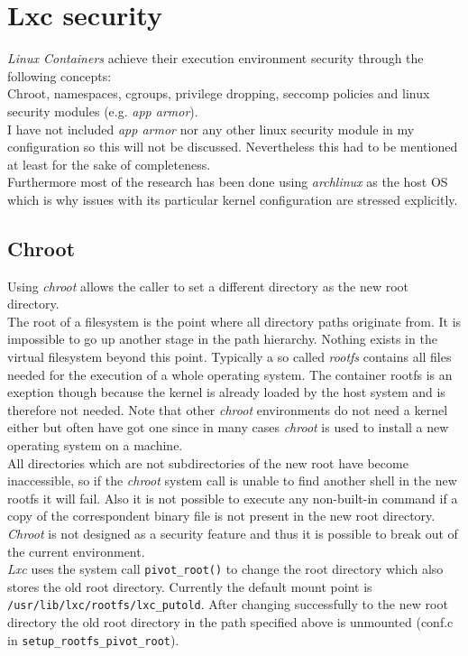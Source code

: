 \chapter{Lxc security}\label{features}

\textit{Linux Containers} achieve their execution environment security through the following concepts:\\
Chroot, namespaces, cgroups, privilege dropping, seccomp policies and linux security modules (e.g. \textit{app armor}).\\
I have not included \textit{app armor} nor any other linux security module in my configuration so this will not be discussed.
Nevertheless this had to be mentioned at least for the sake of completeness.\\
Furthermore most of the research has been done using \textit{archlinux} as the host OS which is why issues with its particular
kernel configuration are stressed explicitly.

\section{Chroot}\label{rootfs}

Using \textit{chroot} allows the caller to set a different directory as the new root directory.\\
The root of a filesystem is the point where all directory paths originate from. It is impossible to go up another stage in the path hierarchy.
Nothing exists in the virtual filesystem beyond this point. Typically a so called \textit{rootfs} contains all files needed for
the execution of a whole operating system.
The container rootfs is an exeption though because the kernel is already loaded by
the host system and is therefore not needed. Note that other \textit{chroot} environments do not need a kernel either but often have got one
since in many cases \textit{chroot} is used to install a new operating system on a machine.\\
All directories which are not subdirectories
of the new root have become inaccessible, so if the \textit{chroot} system call is unable to find another shell in the new
rootfs it will fail. Also it is not possible to execute any non-built-in command if a copy of the correspondent binary file is
not present in the new root directory.\\
\textit{Chroot} is not designed as a security feature and thus it is possible to break out of the current environment.\\
\textit{Lxc} uses the system call \texttt{pivot\_root()} to change the root directory which also stores the old root directory.
Currently the default mount point is \texttt{/usr/lib/lxc/rootfs/lxc\_putold}. After changing successfully to the new root directory
the old root directory in the path specified above is unmounted (conf.c in \texttt{setup\_rootfs\_pivot\_root}).

